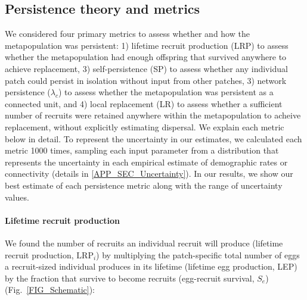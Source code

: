 \documentclass[12pt, oneside]{article}   	%
\begin{document}
\subsection*{Persistence theory and metrics}

We considered four primary metrics to assess whether and how the metapopulation was persistent: 1) lifetime recruit production (LRP) to assess whether the metapopulation had enough offspring that survived anywhere to achieve replacement, 3) self-persistence (SP) to assess whether any individual patch could persist in isolation without input from other patches, 3) network persistence ($\lambda_c$) to assess whether the metapopulation was persistent as a connected unit, and 4) local replacement (LR) to assess whether a sufficient number of recruits were retained anywhere within the metapopulation to acheive replacement, without explicitly estimating dispersal. We explain each metric below in detail. To represent the uncertainty in our estimates, we calculated each metric 1000 times, sampling each input parameter from a distribution that represents the uncertainty in each empirical estimate of demographic rates or connectivity (details in \ref{APP_SEC_Uncertainty}). In our results, we show our best estimate of each persistence metric along with the range of uncertainty values. %

\paragraph*{Lifetime recruit production}

We found the number of recruits an individual recruit will produce (lifetime recruit production, $\text{LRP}_i$) by multiplying the patch-specific total number of eggs a recruit-sized individual produces in its lifetime (lifetime egg production, LEP) by the fraction that survive to become recruits (egg-recruit survival, $S_e$) (Fig.\ \ref{FIG_Schematic}):
\end{document}
